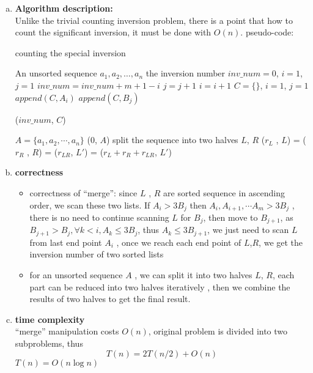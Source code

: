 \begin{enumerate}[a.)]
	\item \textbf{Algorithm description:} \\
	Unlike the trivial counting inversion problem, there is a point that how to count the significant inversion, it must be done with $O(n)$.
	pseudo-code:
	\begin{algorithm}[H]
		\caption{counting the special inversion}
		\begin{algorithmic}[1]
			\Require An unsorted sequence $a_1, a_2,\dots , a_n$	
			\Ensure  the inversion number
				\State $inv\_num = 0$, $i = 1$, $j = 1$
						\State $inv\_num = inv\_num + m+1 - i$
						\State $j = j+1$
					\Else
						\State $i = i +1 $
					\EndIf 
				\EndWhile
				\State $C = \{\}$, $i = 1$, $j=1$
						\State $append(C,{A_i})$
					\Else
						\State $append(C,{B_j})$
					\EndIf 
				\EndFor 
				
				\State \Return ($inv\_num$, $C$)
			\EndFunction 
			
			 {$A = \{a_1,a_2,\cdots, a_n\}$}
						\State\Return ($0$, $A$)
					\EndIf
				\State split the sequence into two halves $L$, $R$ 
				\State ($r_L$ , $L$) = 
				\State ($r_R$ , $R$) = 
				\State ($r_{LR}$, $L'$) = 
				\State \Return ($r_L + r_R +r_{LR}$, $L'$)
			\EndFunction 
		\end{algorithmic}	
	\end{algorithm}
	\item \textbf{correctness} 
		\begin{itemize}
			\item correctness of ``merge'': since $L$ , $R$ are sorted sequence in ascending order, we scan these two lists. If $A_i > 3B_j$ then $A_i, A_{i+1} ,\cdots A_m > 3B_j$ , there is no need to continue scanning $L$ for $B_j$, then move to $B_{j+1}$, as $B_{j+1} > B_{j}, \forall k <i, A_{k} \leq 3B_j$, thus $A_k \leq 3B_{j+1}$, we just need to scan $L$ from last end point $A_i$ , once we reach each end point of $L$,$R$, we get the inversion number of two sorted lists
			\item  for an unsorted sequence $A$	, we can split it into two halves $L$, $R$,
			each part can be reduced into two halves iteratively , then we combine the results of two halves to get the final result.
			
			
		\end{itemize}
	
	\item \textbf{time complexity} \\	
	``merge'' manipulation costs $O(n)$, original problem is divided into two subproblems, thus
	\[
		T(n) = 2T(n/2) + O(n)
	\]
	$T(n) = O(n\log n)$
	
	
	
	
\end{enumerate}